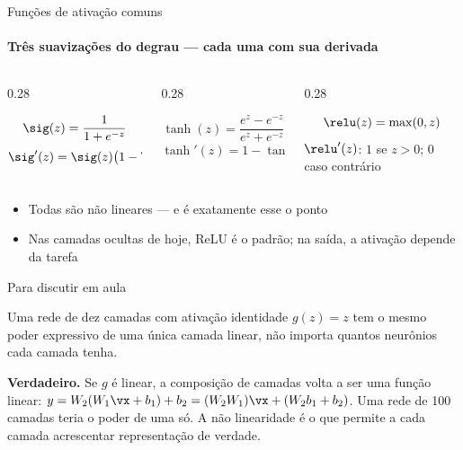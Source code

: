 \documentclass[aspectratio=169, 11pt]{beamer}
\begin{document}
\begin{frame}{Funções de ativação comuns}
  \framesubtitle{Três suavizações do degrau — cada uma com sua derivada}

  \begin{columns}[T]
    \begin{column}{0.28\textwidth}
      \begin{tcolorbox}[iccaixa=icCiano, title={Sigmoide}]
        \small\[ \sig(z) = \frac{1}{1 + e^{-z}} \]
        \footnotesize\[ \sig'(z) = \sig(z)\bigl(1 - \sig(z)\bigr) \]
      \end{tcolorbox}
    \end{column}
    \begin{column}{0.28\textwidth}
      \begin{tcolorbox}[iccaixa=icAzulClaro, title={Tangente hiperbólica}]
        \small\[ \tanh(z) = \frac{e^{z} - e^{-z}}{e^{z} + e^{-z}} \]
        \footnotesize\[ \tanh'(z) = 1 - \tanh^{2}(z) \]
      \end{tcolorbox}
    \end{column}
    \begin{column}{0.28\textwidth}
      \begin{tcolorbox}[iccaixa=icMagenta, title={ReLU}]
        \small\[ \relu(z) = \max(0, z) \]
        \footnotesize $\relu'(z)$: $1$ se $z > 0$; $0$ caso contrário
      \end{tcolorbox}
    \end{column}
  \end{columns}

  \begin{itemize}\setlength{\itemsep}{0.3ex}
    \item Todas são \alert{não lineares} — e é exatamente esse o ponto
    \item Nas camadas ocultas de hoje, \alert{ReLU} é o padrão; na saída, a
          ativação depende da tarefa
  \end{itemize}
\end{frame}

\begin{frame}{Para discutir em aula}
  \begin{quizbox}
    Uma rede de dez camadas com ativação identidade $g(z) = z$ tem o mesmo
    poder expressivo de uma única camada linear, não importa quantos
    neurônios cada camada tenha.

    \smallskip
  \end{quizbox}

  \pause

  \begin{respbox}
    \textbf{Verdadeiro.} Se $g$ é linear, a composição de camadas volta a ser
    uma função linear: \(y = W_2(W_1\vx + b_1) + b_2 = (W_2W_1)\vx + (W_2b_1 + b_2)\).
    Uma rede de 100 camadas teria o poder de uma só. A não linearidade é o que
    permite a cada camada acrescentar \alert{representação de verdade}.
  \end{respbox}
\end{frame}
\end{document}
